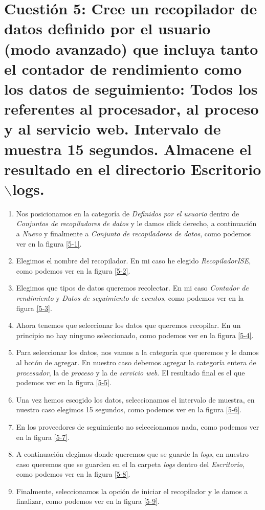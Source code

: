 \documentclass[a4paper,titlepage,12pt]{scrartcl}	%
\numberwithin{figure}{section} %
\numberwithin{table}{section} %
\begin{document}
	\section[Cuestión 5: Cree un recopilador de datos definido por el usuario (modo avanzado) que incluya tanto el contador de rendimiento como los datos de seguimiento: Todos los referentes al procesador, al proceso y al servicio web. Intervalo de muestra 15 segundos. Almacene el resultado en el directorio Escritorio$\backslash$logs.]{Cuestión 5: Cree un recopilador de datos definido por el usuario (modo avanzado) que incluya tanto el contador de rendimiento como los datos de seguimiento: Todos los referentes al procesador, al proceso y al servicio web. Intervalo de muestra 15 segundos. Almacene el resultado en el directorio Escritorio $\backslash$logs.}
	
	\begin{enumerate}
		\item Nos posicionamos en la categoría de \textit{Definidos por el usuario} dentro de \textit{Conjuntos de recopiladores de datos} y le damos click derecho, a continuación a \textit{Nuevo} y finalmente a \textit{Conjunto de recopiladores de datos}, como podemos ver en la figura \ref{5-1}.
		\item Elegimos el nombre del recopilador. En mi caso he elegido \textit{RecopiladorISE}, como podemos ver en la figura \ref{5-2}.
		\item Elegimos que tipos de datos queremos recolectar. En mi caso \textit{Contador de rendimiento} y \textit{Datos de seguimiento de eventos}, como podemos ver en la figura \ref{5-3}.
		\item Ahora tenemos que seleccionar los datos que queremos recopilar. En un principio no hay ninguno seleccionado, como podemos ver en la figura \ref{5-4}.
		\item Para seleccionar los datos, nos vamos a la categoría que queremos y le damos al botón de agregar. En nuestro caso debemos agregar la categoría entera de \textit{procesador}, la de \textit{proceso} y la de \textit{servicio web}. El resultado final es el que podemos ver en la figura \ref{5-5}.
		\item Una vez hemos escogido los datos, seleccionamos el intervalo de muestra, en nuestro caso elegimos 15 segundos, como podemos ver en la figura \ref{5-6}.
		\item En los proveedores de seguimiento no seleccionamos nada, como podemos ver en la figura \ref{5-7}.
		\item A continuación elegimos donde queremos que se guarde la \textit{logs}, en nuestro caso queremos que se guarden en el la carpeta \textit{logs} dentro del \textit{Escritorio}, como podemos ver en la figura \ref{5-8}.
		\item Finalmente, seleccionamos la opción de iniciar el recopilador y le damos a finalizar, como podemos ver en la figura \ref{5-9}.
	\end{enumerate}
	
\end{document}
